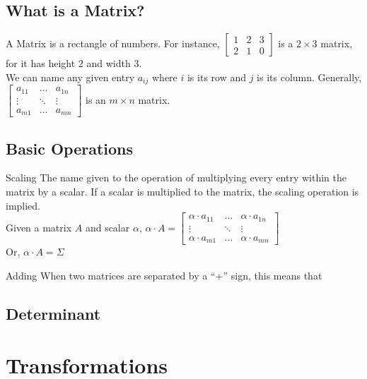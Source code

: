 		\subsection{What is a Matrix?}
			A Matrix is a rectangle of numbers. For instance,
			$ \begin{bmatrix}
				1 & 2 & 3\\
				2 & 1 & 0
			\end{bmatrix} $
			is a $2 \times 3$ matrix, for it has height $2$ and width $3$.\\
			We can name any given entry $a_{ij}$ where $i$ is its row and $j$ is its column. Generally, 
			$ \begin{bmatrix}
			a_{11} & \dots  & a_{1n}\\
			\vdots & \ddots & \vdots\\
			a_{m1} & \dots  & a_{mn}
			\end{bmatrix} $
			is an $m \times n$ matrix.
		\subsection{Basic Operations}
			\begin{mydes}
				\item{Scaling} The name given to the operation of multiplying every entry within the matrix by a scalar. If a scalar is multiplied to the matrix, the scaling operation is implied.\\ Given a matrix $A$ and scalar $\alpha$, $\alpha \cdot A = 
				\begin{bmatrix}
					\alpha\cdot a_{11} & \dots  & \alpha\cdot a_{1n}\\
					\vdots & \ddots & \vdots\\
					\alpha\cdot a_{m1} & \dots  & \alpha\cdot a_{mn}
				\end{bmatrix}$ \\
				Or, $\alpha \cdot A = \Sigma$
				
				\item{Adding} When two matrices are separated by a ``$+$'' sign, this means that 
			\end{mydes}
		\subsection{Determinant}
		
	\section{Transformations}

